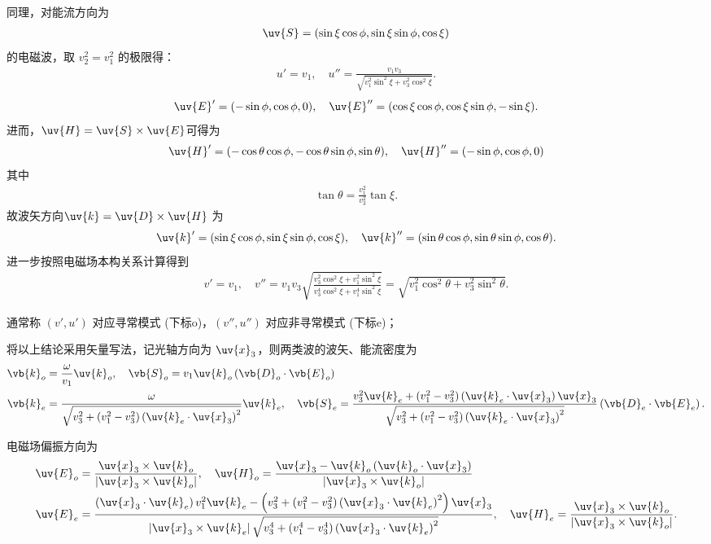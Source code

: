 同理，对能流方向为
\begin{align*}
	\uv{S} = (\sin\xi \cos\phi, \sin\xi \sin\phi, \cos\xi)
\end{align*}
的电磁波，取 \(v_2^2 = v_1^2\) 的极限得：
\begin{align*}
	u' = v_1, \quad u'' = \frac{v_1 v_3}{\sqrt{v_1^2 \sin^2\xi + v_3^2 \cos^2\xi}}.
\end{align*}
\begin{align*}
	\uv{E}' = (-\sin\phi, \cos\phi, 0), \quad \uv{E}'' = (\cos\xi \cos\phi, \cos\xi \sin\phi, -\sin\xi).
\end{align*}
进而，\(\uv{H}=\uv{S} \times \uv{E}\)可得为
\begin{align*}
	\uv{H}' = (-\cos\theta \cos\phi, -\cos\theta \sin\phi, \sin\theta), \quad
	\uv{H}'' = (-\sin\phi, \cos\phi, 0)
\end{align*}
其中
\begin{align*}
	\tan\theta = \frac{v_1^2}{v_3^2} \tan\xi.
\end{align*}
故波矢方向\(\uv{k}=\uv{D} \times \uv{H}\) 为
\begin{align*}
	\uv{k}' = (\sin\xi \cos\phi, \sin\xi \sin\phi, \cos\xi),
	\quad
	\uv{k}'' = (\sin\theta \cos\phi, \sin\theta \sin\phi, \cos\theta).
\end{align*}
进一步按照电磁场本构关系计算得到
\begin{align*}
	v' = v_1, \quad v'' = v_1 v_3 \sqrt{\frac{v_3^2 \cos^2\xi + v_1^2 \sin^2\xi}{v_3^4 \cos^2\xi + v_1^4 \sin^2\xi}} = \sqrt{v_1^2 \cos^2\theta + v_3^2 \sin^2\theta}.
\end{align*}

通常称 \((v', u')\) 对应寻常模式 (下标o)，\((v'', u'')\) 对应非寻常模式 (下标e)；

将以上结论采用矢量写法，记光轴方向为 \(\uv{x}_3\)，则两类波的波矢、能流密度为
\begin{align*}
	\vb{k}_o &= \frac{\omega}{v_1} \uv{k}_o, \quad \vb{S}_o = v_1 \uv{k}_o \left(\vb{D}_o \cdot \vb{E}_o\right)\\
	\vb{k}_e &= \frac{\omega}{\sqrt{v_3^2 + (v_1^2 - v_3^2) \left(\uv{k}_e \cdot \uv{x}_3\right)^2}} \uv{k}_e,\quad
	\vb{S}_e = \frac{v_3^2 \uv{k}_e + (v_1^2 - v_3^2) \left(\uv{k}_e \cdot \uv{x}_3\right) \uv{x}_3}{\sqrt{v_3^2 + (v_1^2 - v_3^2) \left(\uv{k}_e \cdot \uv{x}_3\right)^2}} \left(\vb{D}_e \cdot \vb{E}_e\right).
\end{align*}

电磁场偏振方向为
\begin{align*}
	\uv{E}_o &= \frac{\uv{x}_3 \times \uv{k}_o}{\left| \uv{x}_3 \times \uv{k}_o \right|}, \quad \uv{H}_o = \frac{\uv{x}_3 - \uv{k}_o \left(\uv{k}_o \cdot \uv{x}_3\right)}{\left| \uv{x}_3 \times \uv{k}_o \right|}\\
	\uv{E}_e &= \frac{\left(\uv{x}_3 \cdot \uv{k}_e\right) v_1^2 \uv{k}_e - \left(v_3^2 + (v_1^2 - v_3^2) \left(\uv{x}_3 \cdot \uv{k}_e\right)^2\right) \uv{x}_3}{\left| \uv{x}_3 \times \uv{k}_e \right| \sqrt{v_3^4 + (v_1^4 - v_3^4) \left(\uv{x}_3 \cdot \uv{k}_e\right)^2}},\quad
	\uv{H}_e = \frac{\uv{x}_3 \times \uv{k}_o}{\left| \uv{x}_3 \times \uv{k}_o \right|}.
\end{align*}

